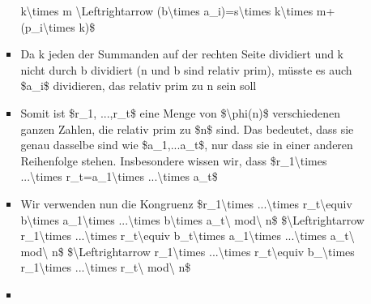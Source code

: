 \documentclass[a4paper]{article}
\begin{document}
\begin{multicols}{3}
\begin{itemize}
\begin{itemize}
\begin{itemize}
                                  k\textbackslash times m \textbackslash Leftrightarrow
                                  (b\textbackslash times a\_i)=s\textbackslash times
                                  k\textbackslash times m+(p\_i\textbackslash times k)\$
                            \item
                                  Da k jeden der Summanden auf der rechten Seite dividiert und k
                                  nicht durch b dividiert (n und b sind relativ prim), müsste es
                                  auch \$a\_i\$ dividieren, das relativ prim zu n sein soll
                            \item
                                  Somit ist \$r\_1, ...,r\_t\$ eine Menge von
                                  \$\textbackslash phi(n)\$ verschiedenen ganzen Zahlen, die relativ
                                  prim zu \$n\$ sind. Das bedeutet, dass sie genau dasselbe sind wie
                                  \$a\_1,...a\_t\$, nur dass sie in einer anderen Reihenfolge
                                  stehen. Insbesondere wissen wir, dass \$r\_1\textbackslash times
                                  ...\textbackslash times r\_t=a\_1\textbackslash times
                                  ...\textbackslash times a\_t\$
                            \item
                                  Wir verwenden nun die Kongruenz \$r\_1\textbackslash times
                                  ...\textbackslash times r\_t\textbackslash equiv
                                  b\textbackslash times a\_1\textbackslash times
                                  ...\textbackslash times b\textbackslash times a\_t\textbackslash{}
                                  mod\textbackslash{} n\$ \$\textbackslash Leftrightarrow
                                  r\_1\textbackslash times ...\textbackslash times
                                  r\_t\textbackslash equiv b\_t\textbackslash times
                                  a\_1\textbackslash times ...\textbackslash times
                                  a\_t\textbackslash{} mod\textbackslash{} n\$
                                  \$\textbackslash Leftrightarrow r\_1\textbackslash times
                                  ...\textbackslash times r\_t\textbackslash equiv
                                  b\_\textbackslash times r\_1\textbackslash times
                                  ...\textbackslash times r\_t\textbackslash{} mod\textbackslash{}
                                  n\$
                            \item

\end{itemize}
\end{itemize}
\end{itemize}
\end{multicols}
\end{document}
